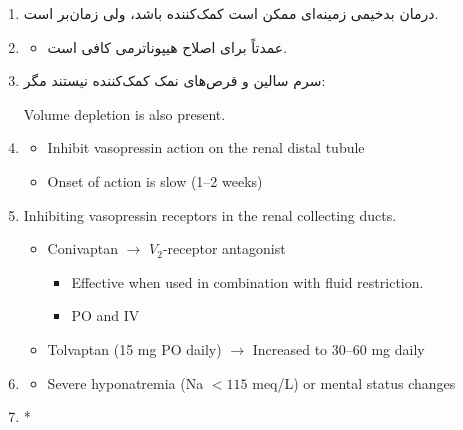 \documentclass[a4paper,12pt]{article}
\begin{document}
\begin{enumerate}[label=\arabic*.,start=15]
\item درمان بدخیمی زمینه‌ای ممکن است کمک‌کننده باشد، ولی زمان‌بر است.
\item {}
\begin{itemize}
\item عمدتاً برای اصلاح هیپوناترمی کافی است.
\end{itemize}
\item سرم سالین و قرص‌های نمک کمک‌کننده نیستند مگر:
\begin{latin}\noindent Volume depletion is also present.\end{latin}
\item {}
\begin{latin}
\begin{itemize}
\item Inhibit vasopressin action on the renal distal tubule
\item Onset of action is slow (1--2 weeks)
\end{itemize}
\end{latin}
\item {}
\begin{latin}
\noindent Inhibiting vasopressin receptors in the renal collecting ducts.
\begin{itemize}
\item Conivaptan $\longrightarrow$ $V_2$-receptor antagonist
\begin{itemize}
\item Effective when used in combination with fluid restriction.
\item PO and IV
\end{itemize}
\item Tolvaptan (15 mg PO daily) $\longrightarrow$ Increased to 30--60 mg daily
\end{itemize}
\end{latin}
\item {}
\begin{latin}
\begin{itemize}
\item Severe hyponatremia (Na $<115$ meq/L) or mental status changes
\end{itemize}
\end{latin}
\item {} *
\end{enumerate}
\end{document}
